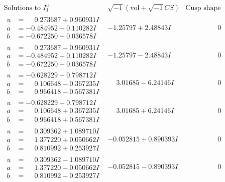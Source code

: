\documentclass[1p]{elsarticle_modified}
\theoremstyle{definition}
\newcommand{\I}{\sqrt{-1}}
\begin{document}
$$\begin{array}{c|c|c}  
\text{Solutions to }I^u_{1}& \I (\text{vol} + \sqrt{-1}CS) & \text{Cusp shape}\\
 \hline 
\begin{aligned}
u &= \phantom{-}0.273687 + 0.960931 I \\
a &= -0.484952 - 0.110282 I \\
b &= -0.672250 + 0.036578 I\end{aligned}
 & -1.25797 + 2.48843 I & \phantom{-0.000000 } 0 \\ \hline\begin{aligned}
u &= \phantom{-}0.273687 - 0.960931 I \\
a &= -0.484952 + 0.110282 I \\
b &= -0.672250 - 0.036578 I\end{aligned}
 & -1.25797 - 2.48843 I & \phantom{-0.000000 } 0 \\ \hline\begin{aligned}
u &= -0.628229 + 0.798712 I \\
a &= \phantom{-}0.106648 - 0.367235 I \\
b &= \phantom{-}0.966418 - 0.567381 I\end{aligned}
 & \phantom{-}3.01685 - 6.24146 I & \phantom{-0.000000 } 0 \\ \hline\begin{aligned}
u &= -0.628229 - 0.798712 I \\
a &= \phantom{-}0.106648 + 0.367235 I \\
b &= \phantom{-}0.966418 + 0.567381 I\end{aligned}
 & \phantom{-}3.01685 + 6.24146 I & \phantom{-0.000000 } 0 \\ \hline\begin{aligned}
u &= \phantom{-}0.309362 + 1.089710 I \\
a &= \phantom{-}1.377220 + 0.050662 I \\
b &= \phantom{-}0.810992 + 0.253927 I\end{aligned}
 & -0.052815 + 0.890393 I & \phantom{-0.000000 } 0 \\ \hline\begin{aligned}
u &= \phantom{-}0.309362 - 1.089710 I \\
a &= \phantom{-}1.377220 - 0.050662 I \\
b &= \phantom{-}0.810992 - 0.253927 I\end{aligned}
 & -0.052815 - 0.890393 I & \phantom{-0.000000 } 0 \\ \hline\begin{aligned}

\end{aligned}
\end{array}$$
\end{document}
